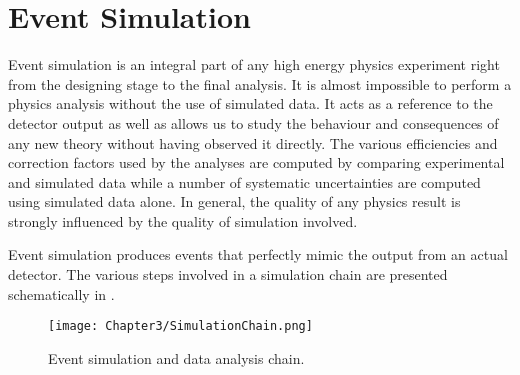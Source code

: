 \section{Event Simulation}
Event simulation is an integral part of any high energy physics experiment right from the designing stage to the final analysis.
It is almost impossible to perform a physics analysis without the use of simulated data. It acts as a reference to the detector output as well as
allows us to study the behaviour and consequences of any new theory without having observed it directly. 
The various efficiencies and correction factors used by the analyses are computed by comparing experimental and simulated data while a number of
systematic uncertainties are computed using simulated data alone. In general, the quality of any physics result is strongly
influenced by the quality of simulation involved. 

Event simulation produces events that perfectly mimic the output from an actual detector. The various steps involved in a simulation chain are presented schematically
in \fig{\ref{fig:SimChain}}. 
\begin{figure}[h]
\begin{center}
\texttt{[image: Chapter3/SimulationChain.png]}
\caption{Event simulation and data analysis chain.}
\label{fig:SimChain}
\end{center}
\end{figure}

